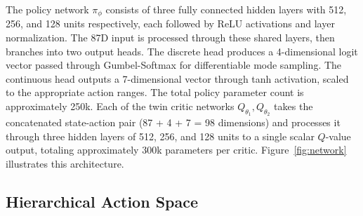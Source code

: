 \documentclass[conference]{IEEEtran}
\begin{document}
The policy network $\pi_\phi$ consists of three fully connected hidden layers with 512, 256, and 128 units respectively, each followed by ReLU activations and layer normalization. The 87D input is processed through these shared layers, then branches into two output heads. The discrete head produces a 4-dimensional logit vector passed through Gumbel-Softmax for differentiable mode sampling. The continuous head outputs a 7-dimensional vector through tanh activation, scaled to the appropriate action ranges. The total policy parameter count is approximately 250k. Each of the twin critic networks $Q_{\theta_1}, Q_{\theta_2}$ takes the concatenated state-action pair (87 + 4 + 7 = 98 dimensions) and processes it through three hidden layers of 512, 256, and 128 units to a single scalar $Q$-value output, totaling approximately 300k parameters per critic. Figure~\ref{fig:network} illustrates this architecture.


\subsection{Hierarchical Action Space}
\end{document}
